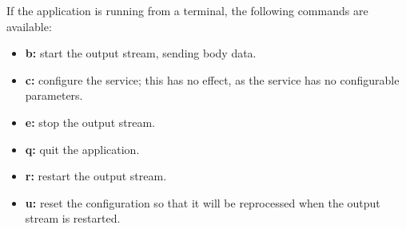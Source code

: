 If the application is running from a terminal, the following commands are available:
\begin{itemize}
\item \textbf{b:} start the output stream, sending body data. 
\item \textbf{c:} configure the service; this has no effect, as the service has no
configurable parameters. 
\item \textbf{e:} stop the output stream. 
\item \textbf{q:} quit the application. 
\item \textbf{r:} restart the output stream. 
\item \textbf{u:} reset the configuration so that it will be reprocessed when the output
stream is restarted.
\end{itemize}
\primaryEnd{}
